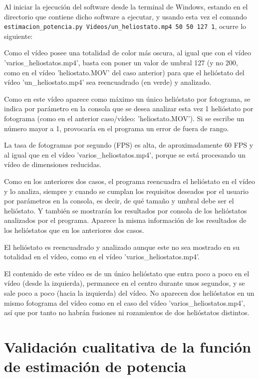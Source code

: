 Al iniciar la ejecución del software desde la terminal de Windows, estando en el directorio que contiene dicho software a ejecutar, y usando esta vez el comando \verb|estimacion_potencia.py Videos/un_heliostato.mp4 50 50 127 1|, ocurre lo siguiente:

Como el vídeo posee una totalidad de color más oscura, al igual que con el vídeo 'varios\_heliostatos.mp4', basta con poner un valor de umbral 127 (y no 200, como en el vídeo 'heliostato.MOV' del caso anterior) para que el helióstato del vídeo 'un\_heliostato.mp4' sea reencuadrado (en verde) y analizado.

Como en este vídeo aparece como máximo un único helióstato por fotograma, se indica por parámetro en la consola que se desea analizar esta vez 1 helióstato por fotograma (como en el anterior caso/vídeo: 'heliostato.MOV'). Si se escribe un número mayor a 1, provocaría en el programa un error de fuera de rango.

La tasa de fotogramas por segundo (FPS) es alta, de aproximadamente 60 FPS y al igual que en el vídeo 'varios\_heliostatos.mp4', porque se está procesando un vídeo de dimensiones reducidas.

Como en los anteriores dos casos, el programa reencuadra el helióstato en el vídeo y lo analiza, siempre y cuando se cumplan los requisitos deseados por el usuario por parámetros en la consola, es decir, de qué tamaño y umbral debe ser el helióstato. Y también se mostrarán los resultados por consola de los helióstatos analizados por el programa. Aparece la misma información de los resultados de los helióstatos que en los anteriores dos casos.

El helióstato es reencuadrado y analizado aunque este no sea mostrado en su totalidad en el vídeo, como en el vídeo 'varios\_heliostatos.mp4'.

El contenido de este vídeo es de un único helióstato que entra poco a poco en el vídeo (desde la izquierda), permanece en el centro durante unos segundos, y se sale poco a poco (hacia la izquierda) del vídeo. No aparecen dos helióstatos en un mismo fotograma del vídeo como en el caso del vídeo 'varios\_heliostatos.mp4', así que por tanto no habrán fusiones ni rozamientos de dos helióstatos distintos.

\section{Validación cualitativa de la función de estimación de potencia}

